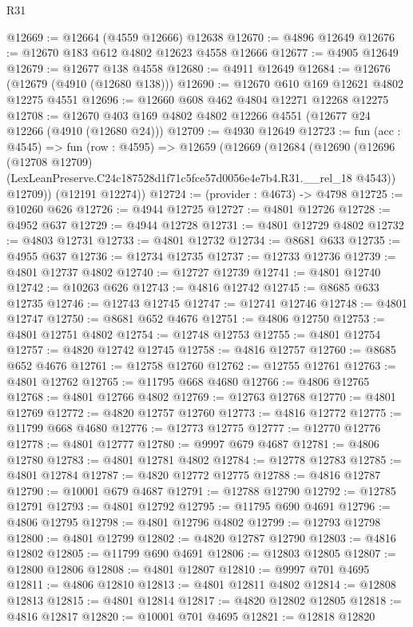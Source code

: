 \begin{lexlean}{R31}
\begin{coremodule}
@12669 := @12664 (@4559 @12666) @12638
@12670 := @4896 @12649
@12676 := @12670 @183 @612 @4802 @12623 @4558 @12666
@12677 := @4905 @12649
@12679 := @12677 @138 @4558
@12680 := @4911 @12649
@12684 := @12676 (@12679 (@4910 (@12680 @138)))
@12690 := @12670 @610 @169 @12621 @4802 @12275 @4551
@12696 := @12660 @608 @462 @4804 @12271 @12268 @12275
@12708 := @12670 @403 @169 @4802 @4802 @12266 @4551 (@12677 @24 @12266 (@4910 (@12680 @24)))
@12709 := @4930 @12649
@12723 := fun (acc : @4545) =>
  fun (row : @4595) =>
  @12659
    (@12669
      (@12684
        (@12690
          (@12696
            (@12708 @12709)
            (LexLeanPreserve.C24c187528d1f71c5fce57d0056e4e7b4.R31.__rel_18 @4543))
          @12709))
      (@12191 @12274))
@12724 := (provider : @4673) -> @4798
@12725 := @10260 @626
@12726 := @4944 @12725
@12727 := @4801 @12726
@12728 := @4952 @637
@12729 := @4944 @12728
@12731 := @4801 @12729 @4802
@12732 := @4803 @12731
@12733 := @4801 @12732
@12734 := @8681 @633
@12735 := @4955 @637
@12736 := @12734 @12735
@12737 := @12733 @12736
@12739 := @4801 @12737 @4802
@12740 := @12727 @12739
@12741 := @4801 @12740
@12742 := @10263 @626
@12743 := @4816 @12742
@12745 := @8685 @633 @12735
@12746 := @12743 @12745
@12747 := @12741 @12746
@12748 := @4801 @12747
@12750 := @8681 @652 @4676
@12751 := @4806 @12750
@12753 := @4801 @12751 @4802
@12754 := @12748 @12753
@12755 := @4801 @12754
@12757 := @4820 @12742 @12745
@12758 := @4816 @12757
@12760 := @8685 @652 @4676
@12761 := @12758 @12760
@12762 := @12755 @12761
@12763 := @4801 @12762
@12765 := @11795 @668 @4680
@12766 := @4806 @12765
@12768 := @4801 @12766 @4802
@12769 := @12763 @12768
@12770 := @4801 @12769
@12772 := @4820 @12757 @12760
@12773 := @4816 @12772
@12775 := @11799 @668 @4680
@12776 := @12773 @12775
@12777 := @12770 @12776
@12778 := @4801 @12777
@12780 := @9997 @679 @4687
@12781 := @4806 @12780
@12783 := @4801 @12781 @4802
@12784 := @12778 @12783
@12785 := @4801 @12784
@12787 := @4820 @12772 @12775
@12788 := @4816 @12787
@12790 := @10001 @679 @4687
@12791 := @12788 @12790
@12792 := @12785 @12791
@12793 := @4801 @12792
@12795 := @11795 @690 @4691
@12796 := @4806 @12795
@12798 := @4801 @12796 @4802
@12799 := @12793 @12798
@12800 := @4801 @12799
@12802 := @4820 @12787 @12790
@12803 := @4816 @12802
@12805 := @11799 @690 @4691
@12806 := @12803 @12805
@12807 := @12800 @12806
@12808 := @4801 @12807
@12810 := @9997 @701 @4695
@12811 := @4806 @12810
@12813 := @4801 @12811 @4802
@12814 := @12808 @12813
@12815 := @4801 @12814
@12817 := @4820 @12802 @12805
@12818 := @4816 @12817
@12820 := @10001 @701 @4695
@12821 := @12818 @12820

\end{coremodule}
\end{lexlean}
